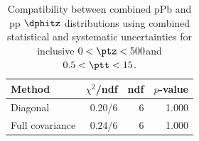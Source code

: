 \begin{table}[htp!]
\centering
\begin{tabular}{|l|r|r|r|}
\hline
Method & $\chi^2$/ndf & ndf & $p$-value \\
\hline
Diagonal & 0.20/6 & 6 & 1.000 \\
Full covariance & 0.24/6 & 6 & 1.000 \\
\hline
\end{tabular}
\caption{Compatibility between combined pPb and pp $\dphitz$ distributions using combined statistical and systematic uncertainties for inclusive $0 < \ptz < 500$\GeV and $0.5 < \ptt < 15$\GeV.}
\label{table:chisq_dphi}
\end{table}
